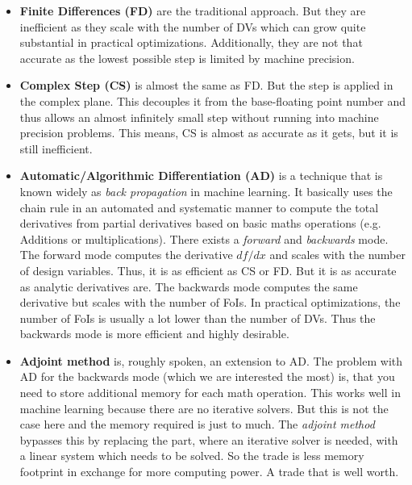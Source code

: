 \begin{itemize}
    \item \textbf{Finite Differences (FD)} are the traditional approach. But
        they are inefficient as they scale with the number of DVs which can
        grow quite substantial in practical optimizations. Additionally, they
        are not that accurate as the lowest possible step is limited by machine
        precision.

    \item \textbf{Complex Step (CS)} is almost the same as FD. But the step is
        applied in the complex plane. This decouples it from the base-floating
        point number and thus allows an almost infinitely small step without
        running into machine precision problems. This means, CS is almost as
        accurate as it gets, but it is still inefficient.

    \item \textbf{Automatic/Algorithmic Differentiation (AD)} is a technique
        that is known widely as \textit{back propagation} in machine learning.
        It basically uses the chain rule in an automated and systematic manner
        to compute the total derivatives from partial derivatives based on
        basic maths operations (e.g. Additions or multiplications). There
        exists a \textit{forward} and \textit{backwards} mode. The forward mode
        computes the derivative $d f / d x$ and scales with the number of
        design variables. Thus, it is as efficient as CS or FD. But it is as
        accurate as analytic derivatives are. The backwards mode computes the
        same derivative but scales with the number of FoIs. In practical
        optimizations, the number of FoIs is usually a lot lower than the
        number of DVs. Thus the backwards mode is more efficient and highly
        desirable.

    \item \textbf{Adjoint method} is, roughly spoken, an extension to AD. The
        problem with AD for the backwards mode (which we are interested the
        most) is, that you need to store additional memory for each math
        operation. This works well in machine learning because there are no
        iterative solvers. But this is not the case here and the memory
        required is just to much. The \textit{adjoint method} bypasses this by
        replacing the part, where an iterative solver is needed,  with a linear
        system which needs to be solved. So the trade is less memory footprint
        in exchange for more computing power. A trade that is well worth.
\end{itemize}





